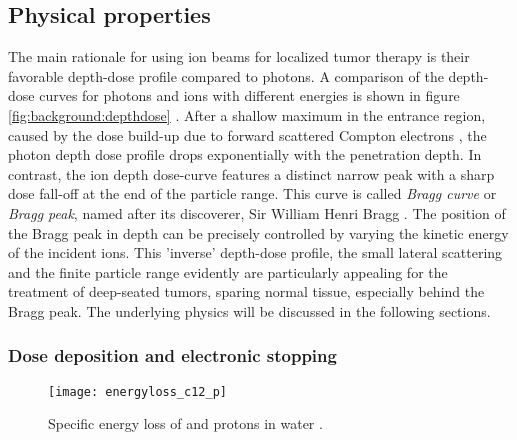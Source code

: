 \subsection{Physical properties}
The main rationale for using ion beams for localized tumor therapy is
their favorable depth-dose profile compared to photons. A comparison
of the depth-dose curves for photons and ions with different energies
is shown in figure \vref{fig:background:depthdose}
\citep{Schardt2010}. After a shallow maximum in the entrance region,
caused by the dose build-up due to forward scattered Compton electrons
\citep{Alpen1998}, the photon depth dose profile drops exponentially
with the penetration depth. In contrast, the ion depth dose-curve
features a distinct narrow peak with a sharp dose fall-off at the end
of the particle range. This curve is called \emph{Bragg curve} or
\emph{Bragg peak}, named after its discoverer, Sir William Henri Bragg
\citep{Bragg1905}. The position of the Bragg peak in depth can be
precisely controlled by varying the kinetic energy of the incident
ions. This 'inverse' depth-dose profile, the small lateral scattering
and the finite particle range evidently are particularly appealing for
the treatment of deep-seated tumors, sparing normal tissue, especially
behind the Bragg peak. The underlying physics will be discussed in the
following sections.

\subsubsection{Dose deposition and electronic stopping}
%
%
\begin{figure}[tpb]
  \centering
  \texttt{[image: energyloss\_c12\_p]}
  \caption[Specific energy loss of \Ctw and protons in water.]{
    Specific energy loss of \Ctw and protons in water
    \citep{Schardt2010}.}
  \label{fig:background:energyloss}
\end{figure}

